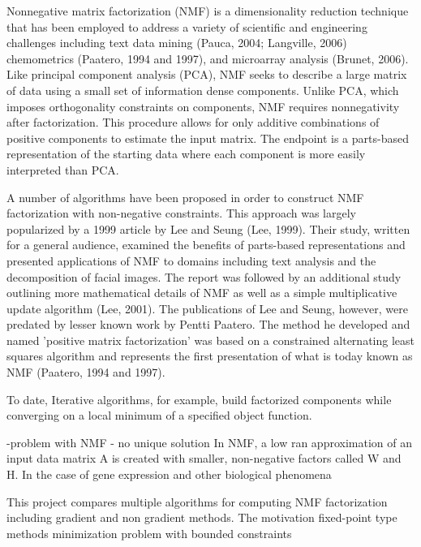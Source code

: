 \documentclass[final,leqno,onefignum,onetabnum]{siamltex1213}
\begin{document}
Nonnegative matrix factorization (NMF) is a dimensionality reduction technique that  has been employed to address a variety of scientific and engineering challenges including text data mining (Pauca, 2004; Langville, 2006) chemometrics (Paatero, 1994 and 1997), and microarray analysis (Brunet, 2006). Like principal component analysis (PCA), NMF seeks to describe a large matrix of data using a small set of information dense components. Unlike PCA, which imposes orthogonality constraints on components, NMF requires nonnegativity after factorization. This procedure allows for only additive combinations of positive components to estimate the input matrix. The endpoint is a parts-based representation of the starting data where each component is more easily interpreted than PCA. 

A number of algorithms have been proposed in order to construct NMF factorization with non-negative constraints. This approach was largely popularized by a 1999 article by Lee and Seung (Lee, 1999). Their study, written for a general audience, examined the benefits of parts-based representations and presented applications of NMF to domains including text analysis and the decomposition of facial images. The report was followed by an additional study outlining more mathematical details of NMF as well as a simple multiplicative update algorithm (Lee, 2001). The publications of Lee and Seung, however, were predated by lesser known work by Pentti Paatero. The method he developed and named 'positive matrix factorization' was based on a constrained alternating least squares algorithm and represents the first presentation of what is today known as NMF (Paatero, 1994 and 1997). 



To date, 
Iterative algorithms, for example, build factorized components while converging on a local minimum of a specified object function. 

-problem with NMF - no unique solution 
In NMF, a low ran approximation of an input data matrix A is created with smaller, non-negative factors called W and H. 
In the case of gene expression and other biological phenomena 

This project compares multiple algorithms for computing NMF factorization including gradient and non gradient methods. The motivation 
fixed-point type methods 
minimization problem with bounded constraints 
\end{document}
